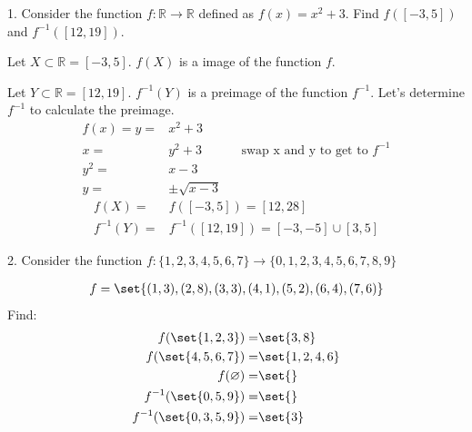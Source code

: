 \documentclass{hippoidC}
\begin{document}
\toc{}
\thispagestyle{styleTOC}
\pagebreak
\pagestyle{styleE}

\begin{prooflist}{1. Consider the function $f: \mathbb{R} \rightarrow \mathbb{R}$ defined as $f(x)=x^2+3$. Find $f([-3,5])$ and $f^{-1}([12,19])$.}
	\item \imagedef{}
	\item Let $X\subset \mathbb{R}= [-3,5]$. $f(X)$ is a image of the function $f$.
	\item Let $Y\subset \mathbb{R}= [12,19]$. $f^{-1}(Y)$ is a preimage of the
	function $f^{-1}$.
	Let's determine $f^{-1}$ to calculate the preimage.
	\begin{align*}
		f(x) = y = & x^2+3                                                   \\
		x=         & y^2+3         &  & \text{swap x and y to get to }f^{-1} \\
		y^2=       & x-3                                                     \\
		y=         & \pm\sqrt{x-3}
	\end{align*}
	\begin{align*}
		f(X) =      & f([-3, 5]) = [12, 28]                   \\
		f^{-1}(Y) = & f^{-1}([12, 19]) = [-3, -5] \cup [3, 5]
	\end{align*}
\end{prooflist}


\begin{prooflist}{2. Consider the function $f:\{1,2,3,4,5,6,7\} \rightarrow\{0,1,2,3,4,5,6,7,8,9\}$ }
	\item \imagedef{}
	\begin{align*}
		f=\set{(1,3),(2,8),(3,3),(4,1),(5,2),(6,4),(7,6)}
	\end{align*}
	Find:
	\begin{align*}
		f(\set{1,2,3})=         & \set {3, 8}      \\
		f(\set{4,5,6,7}) =      & \set{1, 2, 4, 6} \\
		f(\varnothing) =        & \set{}           \\
		f^{-1}(\set{0,5,9}) =   & \set{}           \\
		f^{-1}(\set{0,3,5,9}) = & \set{3}          \\
	\end{align*}
\end{prooflist}
\end{document}
